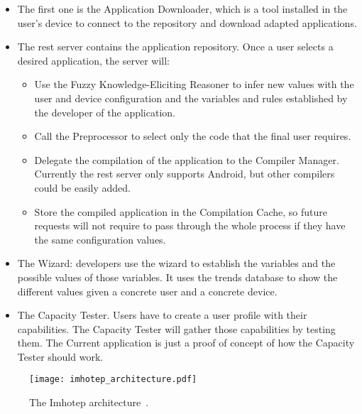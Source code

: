 \begin{itemize}
    \item The first one is the Application Downloader, which is a tool installed
    in the user's device to connect to the repository and download adapted
    applications.
    
    \item The \ac{rest} server contains the application repository. Once a user 
    selects a desired application, the server will:
    
    \begin{itemize}
      \item Use the Fuzzy Knowledge-Eliciting Reasoner to infer new values with
      the user and device configuration and the variables and rules established
      by the developer of the application.
      
      \item Call the Preprocessor to select only the code that the final user
      requires.
      
      \item Delegate the compilation of the application to the Compiler Manager.
      Currently the \ac{rest} server only supports Android, but other compilers could
      be easily added.
      
      \item Store the compiled application in the Compilation Cache, so future
      requests will not require to pass through the whole process if they have
      the same configuration values.
    \end{itemize}
    
  \item The Wizard: developers use the wizard to establish the variables and the
  possible values of those variables. It uses the trends database to show the
  different values given a concrete user and a concrete device.
  
  \item The Capacity Tester. Users have to create a user profile with their
  capabilities. The Capacity Tester will gather those capabilities by testing
  them. The Current application is just a proof of concept of how the Capacity
  Tester should work.
\end{itemize}

\begin{figure}[H]
\centering
\texttt{[image: imhotep\_architecture.pdf]}
\caption{The Imhotep architecture~\citep{imhotep_website}.}
\label{fig:imhotep_architecture}
\end{figure}

